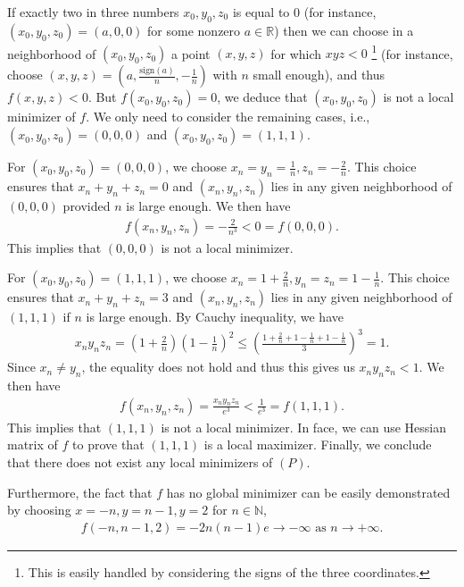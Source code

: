 \documentclass[a4paper]{article}
\numberwithin{equation}{section}
\begin{document}
\begin{enumerate}
If exactly two in three numbers $x_0,y_0,z_0$ is equal to $0$ (for instance, $\left(x_0,y_0,z_0\right)=\left(a,0,0\right)$ for some nonzero $a\in \mathbb{R}$) then we can choose in a neighborhood of $\left(x_0,y_0,z_0\right)$ a point $\left(x,y,z\right)$ for which $xyz<0$ \footnote{This is easily handled by considering the signs of the three coordinates.} (for instance, choose $\left( {x,y,z} \right) = \left( {a,\frac{{\mathrm{sign} \left( a \right)}}{n}, - \frac{1}{n}} \right)$ with $n$ small enough), and thus $f\left(x,y,z\right)<0$. But $f\left(x_0,y_0,z_0\right)=0$, we deduce that $\left(x_0,y_0,z_0\right)$ is not a local minimizer of $f$. We only need to consider the remaining cases, i.e., $\left(x_0,y_0,z_0\right) =\left(0,0,0\right)$ and $\left(x_0,y_0,z_0\right) =\left(1,1,1\right)$.

For $\left(x_0,y_0,z_0\right) =\left(0,0,0\right)$, we choose $x_n = y_n = \frac{1}{n},z_n =  - \frac{2}{n}$. This choice ensures that $x_n+y_n+z_n=0$ and $\left(x_n,y_n,z_n\right)$ lies in any given neighborhood of $\left(0,0,0\right)$ provided $n$ is large enough. We then have
\begin{align}
f\left( {{x_n},{y_n},{z_n}} \right) =  - \frac{2}{{{n^3}}} < 0 = f\left( {0,0,0} \right).
\end{align}
This implies that $\left(0,0,0\right)$ is not a local minimizer. 

For $\left(x_0,y_0,z_0\right) =\left(1,1,1\right)$, we choose $x_n=1+\frac{2}{n},y_n=z_n=1-\frac{1}{n}$. This choice ensures that $x_n+y_n+z_n=3$ and $\left(x_n,y_n,z_n\right)$ lies in any given neighborhood of $\left(1,1,1\right)$ if $n$ is large enough. By Cauchy inequality, we have
\begin{align}
x_ny_nz_n = \left( {1 + \frac{2}{n}} \right){\left( {1 - \frac{1}{n}} \right)^2} \le {\left( {\frac{{1 + \frac{2}{n} + 1 - \frac{1}{n} + 1 - \frac{1}{n}}}{3}} \right)^3} = 1.
\end{align}
Since $x_n\ne y_n$, the equality does not hold and thus this gives us $x_ny_nz_n<1$. We then have
\begin{align}
f\left( {{x_n},{y_n},{z_n}} \right) = \frac{{{x_n}{y_n}{z_n}}}{{{e^3}}} < \frac{1}{{{e^3}}} = f\left( {1,1,1} \right).
\end{align}
This implies that $\left(1,1,1\right)$ is not a local minimizer. In face, we can use Hessian matrix of $f$ to prove that $\left(1,1,1\right)$ is a local maximizer. Finally, we conclude that there does not exist any local minimizers of $\left(P\right)$.

Furthermore, the fact that $f$ has no global minimizer can be easily demonstrated by choosing $x=-n,y=n-1,y=2$ for $n \in \mathbb{N}$, 
\begin{align}
f\left( { - n,n - 1,2} \right) =  - 2n\left( {n - 1} \right)e \to  - \infty \mbox{ as } n \to  + \infty .
\end{align}
\end{enumerate}
\end{document}
